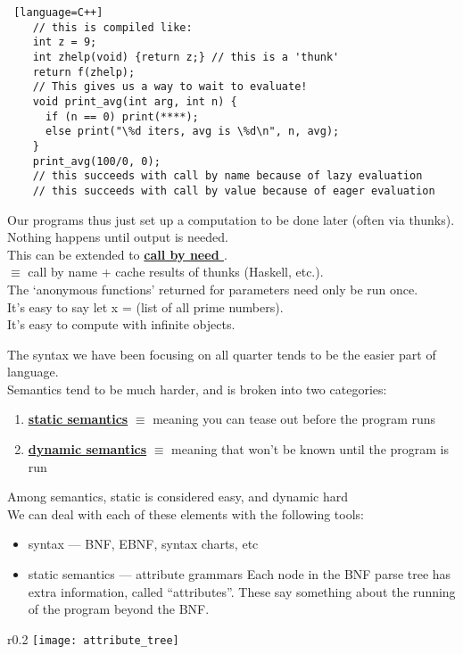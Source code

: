 \documentclass[../../lecture_notes.tex]{subfiles}
\begin{document}
\begin{enumerate} [itemsep=0mm]
\begin{lstlisting} [language=C++]
	// this is compiled like:
	int z = 9;
	int zhelp(void) {return z;} // this is a 'thunk'
	return f(zhelp);
	// This gives us a way to wait to evaluate!
	void print_avg(int arg, int n) {
	  if (n == 0) print(****);
	  else print("\%d iters, avg is \%d\n", n, avg);
	}
	print_avg(100/0, 0); 
	// this succeeds with call by name because of lazy evaluation
	// this succeeds with call by value because of eager evaluation
		\end{lstlisting}
		Our programs thus just set up a computation to be done later (often via thunks).\\
		Nothing happens until output is needed.\\
		This can be extended to \textbf{\underline{call by need }}.\\
		$\equiv$ call by name + cache results of thunks (Haskell, etc.).\\
		The ‘anonymous functions’ returned for parameters need only be run once.\\
		It’s easy to say let x = (list of all prime numbers).\\
		It’s easy to compute with infinite objects.\\
\end{enumerate} \smallskip

The syntax we have been focusing on all quarter tends to be the easier part of language.\\
Semantics tend to be much harder, and is broken into two categories:
\begin{enumerate} [itemsep=0mm]
	\item \textbf{\underline{static semantics}} $\equiv$ meaning you can tease out before the program runs
	\item \textbf{\underline{dynamic semantics}} $\equiv$ meaning that won’t be known until the program is run
\end{enumerate}
\noindent Among semantics, static is considered easy, and dynamic hard
\\
We can deal with each of these elements with the following tools:
\begin{itemize} [itemsep=0mm]
	\item syntax — BNF, EBNF, syntax charts, etc
	\item static semantics — attribute grammars
		Each node in the BNF parse tree has extra information, called “attributes”.
		These say something about the running of the program beyond the BNF.
\end{itemize}

\begin{wrapfigure}{r}{0.2\textwidth}
	\texttt{[image: attribute\_tree]}
	\label{fig:test}
\end{wrapfigure}
\end{document}
